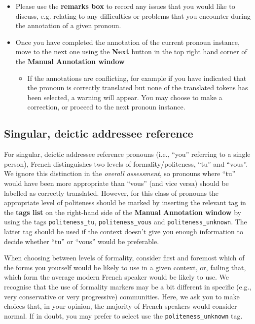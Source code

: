 \documentclass[11pt]{article} %
\newcommand\tag[1]{\texttt{#1}}
\begin{document}
\begin{itemize}
  \item Please use the \textbf{remarks box} to record any issues that you would like to discuss, e.g. relating to any difficulties or problems that you encounter during the annotation of a given pronoun.
  \item Once you have completed the annotation of the current pronoun instance, move to the next one using the \textbf{Next} button in the top right hand corner of the \textbf{Manual Annotation window}
  \begin{itemize}
    \item If the annotations are conflicting, for example if you have indicated that the pronoun is correctly translated but none of the translated tokens has been selected, a warning will appear. You may choose to make a correction, or proceed to the next pronoun instance.
  \end{itemize}
\end{itemize}

\subsection{Singular, deictic addressee reference}

For singular, deictic addressee reference pronouns (i.e., ``you'' referring to
a single person), French distinguishes two levels of formality/politeness,
``tu'' and ``vous''. We ignore this distinction in the \emph{overall
assessment},  so pronouns where ``tu'' would have been more appropriate
than ``vous'' (and vice versa) should be labelled as correctly translated.
However, for this class of pronouns the appropriate level of politeness should
be marked by inserting the relevant tag in the \textbf{tags list} on the
right-hand side of the \textbf{Manual Annotation window} by using the tags
\tag{politeness\_tu}, \tag{politeness\_vous} and \tag{politeness\_unknown}.
The latter tag should be used if the context doesn't give you enough information
to decide whether ``tu'' or ``vous'' would be preferable.

When choosing between levels of formality, consider first and foremost which of
the forms you yourself would be likely to use in a given context, or, failing
that, which form the average modern French speaker would be likely to use. We
recognise that the use of formality markers may be a bit different in specific
(e.g., very conservative or very progressive) communities. Here, we ask you to
make choices that, in your opinion, the majority of French speakers would
consider normal. If in doubt, you may prefer to select use the
\tag{politeness\_unknown} tag.
\end{document}
